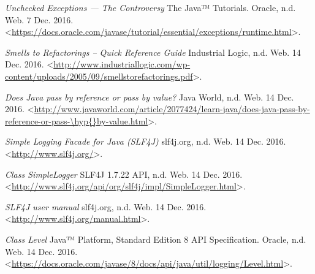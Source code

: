 \begin{thebibliography}{21}

\textit{Unchecked Exceptions — The Controversy} The Java™ Tutorials. Oracle, n.d. Web. 7 Dec. 2016. <\url{https://docs.oracle.com/javase/tutorial/essential/exceptions/runtime.html}>.



\textit{Smells to Refactorings -- Quick Reference Guide} Industrial Logic, n.d. Web. 14 Dec. 2016. <\url{http://www.industriallogic.com/wp-content/uploads/2005/09/smellstorefactorings.pdf}>.


\textit{Does Java pass by reference or pass by value?} Java World, n.d. Web. 14 Dec. 2016. <\url{http://www.javaworld.com/article/2077424/learn-java/does-java-pass-by-reference-or-pass-\hyp{}by-value.html}>.



\textit{Simple Logging Facade for Java (SLF4J)} slf4j.org, n.d. Web. 14 Dec. 2016. <\url{http://www.slf4j.org/}>.


\textit{Class SimpleLogger} SLF4J 1.7.22 API, n.d. Web. 14 Dec. 2016. <\url{http://www.slf4j.org/api/org/slf4j/impl/SimpleLogger.html}>.


\textit{SLF4J user manual} slf4j.org, n.d. Web. 14 Dec. 2016. <\url{http://www.slf4j.org/manual.html}>.


\textit{Class Level} Java™ Platform, Standard Edition 8
API Specification. Oracle, n.d. Web. 14 Dec. 2016. <\url{https://docs.oracle.com/javase/8/docs/api/java/util/logging/Level.html}>.

\end{thebibliography}
